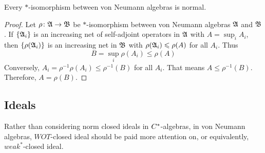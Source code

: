 \documentclass[a4paper,11pt]{report}
\begin{document}
\begin{prop}
	Every $*$-isomorphism between von Neumann algebras is normal.
\end{prop}
\begin{proof}
	Let $\rho \colon \mathfrak{A} \rightarrow \mathfrak{B}$ be $*$-isomorphism between von Neumann algebras $\mathfrak{A}$ and $\mathfrak{B}$. If $\{\mathfrak{A}_i\}$ is an increasing net of self-adjoint operators in $\mathfrak{A}$ with $A = \sup_i A_i$, then $\{\rho(\mathfrak{A}_i)\}$ is an increasing net in $\mathfrak{B}$ with $\rho(\mathfrak{A}_i) \leqslant \rho(A)$ for all $A_i$. Thus 
	\begin{equation*}
		B = \sup_i  \rho(A_i) \leqslant \rho(A)
	\end{equation*}
	Conversely, $A_i = \rho^{-1}\rho(A_i)  \leqslant \rho^{-1}(B)$ for all $A_i$. That means $A \leqslant \rho^{-1}(B)$. Therefore, $A =  \rho(B)$.
\end{proof}

\subsection{Ideals}

Rather than considering norm closed ideals in $C^{*}$-algebras, in von Neumann algebras, $WOT$-closed ideal should be paid more attention on, or equivalently, $weak^*$-closed ideal.
\end{document}
